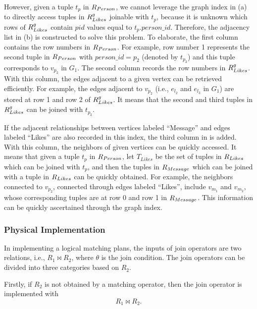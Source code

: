 However, given a tuple $t_p$ in ${R_{Person}}$, we cannot leverage the graph index in (a) to directly access tuples in ${R^g_{Likes}}$ joinable with $t_p$, because it is unknown which rows of ${R^g_{Likes}}$ contain $pid$ values equal to $t_p.person\_id$.
Therefore, the adjacency list in (b) is constructed to solve this problem.
To elaborate, the first column contains the row numbers in ${R_{Person}}$.
For example, row number 1 represents the second tuple in ${R_{Person}}$ with $person\_id = p_2$ (denoted by $t_{p_2}$) and this tuple corresponds to $v_{p_2}$ in $G_1$.
The second column records the row numbers in ${R^g_{Likes}}$.
With this column, the edges adjacent to a given vertex can be retrieved efficiently.
For example, the edges adjacent to $v_{p_2}$ (i.e., $e_{l_2}$ and $e_{l_3}$ in $G_1$) are stored at row 1 and row 2 of ${R^g_{Likes}}$.
It means that the second and third tuples in ${R^g_{Likes}}$ can be joined with $t_{p_2}$.

If the adjacent relationships between vertices labeled ``Message'' and edges labeled ``Likes'' are also recorded in this index, the third column in  is added.
With this column, the neighbors of given vertices can be quickly accessed.
It means that given a tuple $t_p$ in ${R_{Person}}$, let $T_{Likes}$ be the set of tuples in ${R_{Likes}}$ which can be joined with $t_p$, and then the tuples in ${R_{Message}}$ which can be joined with a tuple in ${R_{Likes}}$ can be quickly obtained.
For example, the neighbors connected to $v_{p_2}$, connected through edges labeled ``Likes'', include $v_{m_1}$ and $v_{m_2}$, whose corresponding tuples are at row 0 and row 1 in ${R_{Message}}$.
This information can be quickly ascertained through the graph index.

\subsubsection{Physical Implementation}
\label{sec:join-matching-operator}
In implementing a logical matching plans, the inputs of join operators are two relations, i.e., $R_1 \Join R_2$, where $\theta$ is the join condition.
The join operators can be divided into three categories based on $R_2$.

Firstly, if $R_2$ is not obtained by a matching operator, then the join operator is implemented with
\begin{equation*}
    R_1 \Join R_2.
\end{equation*}

